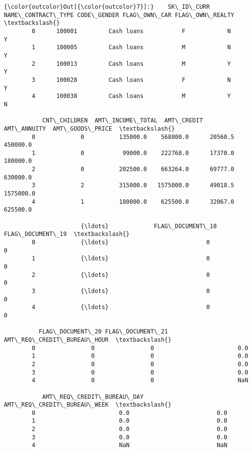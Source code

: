 \documentclass[11pt]{article}
\begin{document}
\begin{Verbatim}[commandchars=\\\{\}]
{\color{outcolor}Out[{\color{outcolor}7}]:}    SK\_ID\_CURR NAME\_CONTRACT\_TYPE CODE\_GENDER FLAG\_OWN\_CAR FLAG\_OWN\_REALTY  \textbackslash{}
        0      100001         Cash loans           F            N               Y   
        1      100005         Cash loans           M            N               Y   
        2      100013         Cash loans           M            Y               Y   
        3      100028         Cash loans           F            N               Y   
        4      100038         Cash loans           M            Y               N   
        
           CNT\_CHILDREN  AMT\_INCOME\_TOTAL  AMT\_CREDIT  AMT\_ANNUITY  AMT\_GOODS\_PRICE  \textbackslash{}
        0             0          135000.0    568800.0      20560.5         450000.0   
        1             0           99000.0    222768.0      17370.0         180000.0   
        2             0          202500.0    663264.0      69777.0         630000.0   
        3             2          315000.0   1575000.0      49018.5        1575000.0   
        4             1          180000.0    625500.0      32067.0         625500.0   
        
                      {\ldots}             FLAG\_DOCUMENT\_18 FLAG\_DOCUMENT\_19  \textbackslash{}
        0             {\ldots}                            0                0   
        1             {\ldots}                            0                0   
        2             {\ldots}                            0                0   
        3             {\ldots}                            0                0   
        4             {\ldots}                            0                0   
        
          FLAG\_DOCUMENT\_20 FLAG\_DOCUMENT\_21 AMT\_REQ\_CREDIT\_BUREAU\_HOUR  \textbackslash{}
        0                0                0                        0.0   
        1                0                0                        0.0   
        2                0                0                        0.0   
        3                0                0                        0.0   
        4                0                0                        NaN   
        
           AMT\_REQ\_CREDIT\_BUREAU\_DAY  AMT\_REQ\_CREDIT\_BUREAU\_WEEK  \textbackslash{}
        0                        0.0                         0.0   
        1                        0.0                         0.0   
        2                        0.0                         0.0   
        3                        0.0                         0.0   
        4                        NaN                         NaN   
        

\end{Verbatim}
\end{document}
